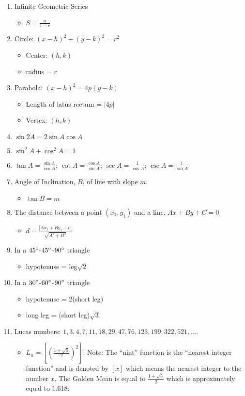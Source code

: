 \documentclass[../uilmath.tex]{subfiles}
\begin{document}
\begin{enumerate}
    \item Infinite Geometric Series 
    \begin{itemize}
        \item $S=\frac{a}{1-r}$
    \end{itemize}
    \item Circle: $(x-h)^2+(y-k)^2=r^2$
    \begin{itemize}
        \item Center: $(h,k)$
        \item radius = $r$
    \end{itemize}
    \item Parabola: $(x-h)^2=4p(y-k)$
    \begin{itemize}
        \item Length of latus rectum = $|4p|$
        \item Vertex: $(h,k)$
    \end{itemize}
    \item $\sin 2A = 2\sin A\cos A$
    \item $\sin^2 A + \cos^2 A = 1$
    \item $\tan A = \frac{\sin A}{\cos A}$; $\cot A = \frac{\cos A}{\sin A}$; $\sec A = \frac{1}{\cos A}$; $\csc A = \frac{1}{\sin A}$
    \item Angle of Inclination, $B$, of line with slope $m$.
    \begin{itemize}
        \item $\tan B = m$
    \end{itemize}
    \item The distance between a point $(x_1,y_1)$ and a line, $Ax+By+C=0$
    \begin{itemize}
        \item $d = \frac{|Ax_1+By_1+c|}{\sqrt{A^2+B^2}}$
    \end{itemize}
    \item In a $45\degree$-$45\degree$-$90\degree$ triangle 
    \begin{itemize}
        \item hypotenuse = leg$\sqrt{2}$
    \end{itemize}
    \item In a $30\degree$-$60\degree$-$90\degree$ triangle 
    \begin{itemize}
        \item hypotenuse = 2(short leg)
        \item long leg = (short leg)$\sqrt{3}$
    \end{itemize}
    \item Lucas numbers: $1,3,4,7,11,18,29,47,76,123,199,322,521,\dots$.
    \begin{itemize}
        \item $L_n = \left[\left(\frac{1+\sqrt{5}}{2}\right)^2\right]$; Note: The ``nint'' function is the ``nearest integer function'' and is denoted by 
        $[x]$ which means the nearest integer to the number $x$. The Golden Mean is equal to $\frac{1+\sqrt{5}}{2}$ which is approximately equal to 1.618.
    \end{itemize}


\end{enumerate}
\end{document}
